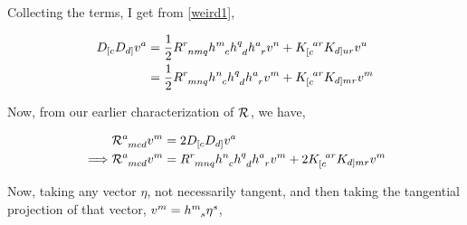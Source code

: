 Collecting the terms, I get from \cref{weird1},

\begin{align*}
    D_{[c} D_{d]}v^a &= \frac{1}{2} \tt{R}{r}{nmq} \tt{h}{m}{c } \tt{h}{q}{d} \tt{h}{a}{r} v^n +K^{\; \; ar}_{[c} K_{d]ur} v^u \\
    &= \frac{1}{2} \tt{R}{r}{mnq} \tt{h}{n}{c } \tt{h}{q}{d} \tt{h}{a}{r} v^m +K^{\; \; ar}_{[c} K_{d]mr} v^m 
\end{align*}

Now, from our earlier characterization of $ \tt{ \mathcal{R}}{}{} $, we have,

\begin{align*}
    &\tt{ \mathcal{R}}{a}{mcd} v^m = 2 D_{[c} D_{d]}v^a \\
    \implies&  \tt{ \mathcal{R}}{a}{mcd} v^m =  \tt{R}{r}{mnq} \tt{h}{n}{c } \tt{h}{q}{d} \tt{h}{a}{r} v^m +2K^{\; \; ar}_{[c} K_{d]mr} v^m 
\end{align*}


Now, taking any vector $ \eta$, not necessarily tangent, and then taking the tangential projection of that vector, $ v^m= \tt{h}{m}{s} \eta^s$,

